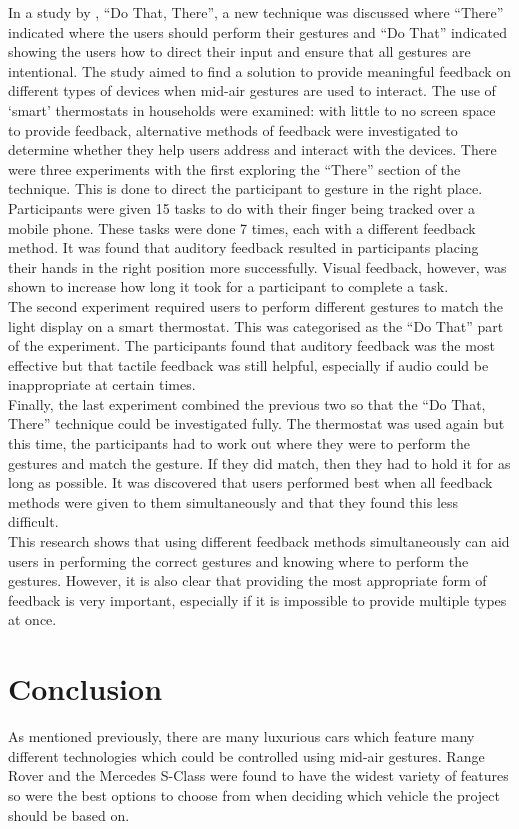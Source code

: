 \documentclass{l4proj}
\begin{document}
In a study by \cite{Freeman_Brewster_Lantz_2015}, “Do That, There”, a new technique was discussed where “There” indicated where the users should perform their gestures and “Do That” indicated showing the users how to direct their input and ensure that all gestures are intentional. The study aimed to find a solution to provide meaningful feedback on different types of devices when mid-air gestures are used to interact. The use of ‘smart’ thermostats in households were examined: with little to no screen space to provide feedback, alternative methods of feedback were investigated to determine whether they help users address and interact with the devices. There were three experiments with the first exploring the “There” section of the technique. This is done to direct the participant to gesture in the right place. Participants were given 15 tasks to do with their finger being tracked over a mobile phone. These tasks were done 7 times, each with a different feedback method. It was found that auditory feedback resulted in participants placing their hands in the right position more successfully. Visual feedback, however, was shown to increase how long it took for a participant to complete a task.\\ The second experiment required users to perform different gestures to match the light display on a smart thermostat. This was categorised as the “Do That” part of the experiment. The participants found that auditory feedback was the most effective but that tactile feedback was still helpful, especially if audio could be inappropriate at certain times.\\
Finally, the last experiment combined the previous two so that the “Do That, There” technique could be investigated fully. The thermostat was used again but this time, the participants had to work out where they were to perform the gestures and match the gesture. If they did match, then they had to hold it for as long as possible. It was discovered that users performed best when all feedback methods were given to them simultaneously and that they found this less difficult. \\
This research shows that using different feedback methods simultaneously can aid users in performing the correct gestures and knowing where to perform the gestures. However, it is also clear that providing the most appropriate form of feedback is very important, especially if it is impossible to provide multiple types at once. 

\section{Conclusion}
As mentioned previously, there are many luxurious cars which feature many different technologies which could be controlled using mid-air gestures. Range Rover and the Mercedes S-Class were found to have the widest variety of features so were the best options to choose from when deciding which vehicle the project should be based on. 
\end{document}
